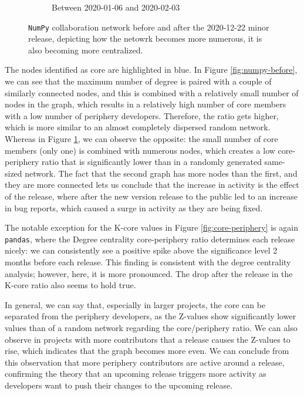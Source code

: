 \begin{figure}[!htbp]
\begin{subfigure}{0.49\textwidth}
        \caption{Between 2020-01-06 and 2020-02-03}
        \label{fig:numpy-after}
    \end{subfigure}
    \caption{\texttt{NumPy} collaboration network before and after the 2020-12-22 minor release, depicting how the netowrk becomes more numerous, it is also becoming more centralized.}
    \label{fig:core-periphery-numpy}
\end{figure}

The nodes identified as core are highlighted in blue. In Figure \ref{fig:numpy-before}, we can see that the maximum number of degree is paired with a couple of similarly connected nodes, and this is combined with a relatively small number of nodes in the graph, which results in a relatively high number of core members with a low number of periphery developers. Therefore, the ratio gets higher, which is more similar to an almost completely dispersed random network. Whereas in Figure \ref{fig:numpy-after}, we can observe the opposite: the small number of core members (only one) is combined with numerous nodes, which creates a low core-periphery ratio that is significantly lower than in a randomly generated same-sized network. The fact that the second graph has more nodes than the first, and they are more connected lets us conclude that the increase in activity is the effect of the release, where after the new version release to the public led to an increase in bug reports, which caused a surge in activity as they are being fixed.

The notable exception for the K-core values in Figure \ref{fig:core-periphery} is again \texttt{pandas}, where the Degree centrality core-periphery ratio determines each release nicely: we can consistently see a positive spike above the significance level 2 months before each release. This finding is consistent with the degree centrality analysis; however, here, it is more pronounced. The drop after the release in the K-core ratio also seems to hold true.

In general, we can say that, especially in larger projects, the core can be separated from the periphery developers, as the Z-values show significantly lower values than of a random network regarding the core/periphery ratio. We can also observe in projects with more contributors that a release causes the Z-values to rise, which indicates that the graph becomes more even. We can conclude from this observation that more periphery contributors are active around a release, confirming the theory that an upcoming release triggers more activity as developers want to push their changes to the upcoming release.


